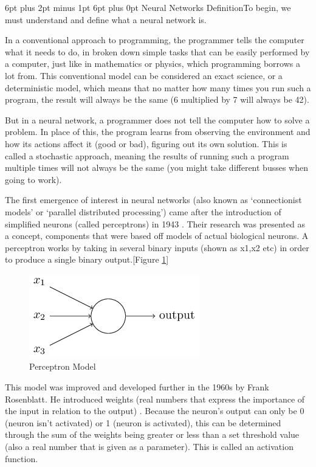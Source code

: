 \documentclass[12pt,a4paper]{article}
\makeatletter
\renewcommand\subsection{\@startsection {subsection}{1}{2mm} %
                               {6pt plus 2pt minus 1pt} %
                               {6pt plus 0pt} %
                               {\normalfont\bfseries}}
\makeatother
\begin{document}
\subsection{Neural Networks Definition}To begin, we must understand and define what a neural network is.\par
In a conventional approach to programming, the programmer tells the computer what it needs to do, in broken down simple tasks that can be easily performed by a computer, just like in mathematics or physics, which programming borrows a lot from. This conventional model can be considered an exact science, or a deterministic model, which means that no matter how many times you run such a program, the result will always be the same (6 multiplied by 7 will always be 42).\par
But in a neural network, a programmer does not tell the computer how to solve a problem. In place of this, the program learns from observing the environment and how its actions affect it (good or bad), figuring out its own solution. This is called a stochastic approach, meaning the results of running such a program multiple times will not always be the same (you might take different busses when going to work).\par
The first emergence of interest in neural networks (also known as ‘connectionist models’ or ‘parallel distributed processing’) \cite{krose_introduction_1993} came after the introduction of simplified neurons (called perceptrons) in 1943 \cite{mcculloch_logical_1943}. Their research was presented as a concept, components that were based off models of actual biological neurons. A perceptron works by taking in several binary inputs (shown as x1,x2 etc)  in order to produce a single binary output.[Figure \ref{fig:1}]\newpage
\begin{figure}[ht]
	\includegraphics{perceptron}
	\centering
	\caption{Perceptron Model \protect \cite{nielsenneural}}
	\label{fig:1}
\end{figure}
\par
This model was improved and developed further in the 1960s by Frank Rosenblatt. He introduced weights (real numbers that express the importance of the input in relation to the output) \cite{rosenblatt_perceptron:_1958}. Because the neuron’s output can only be 0 (neuron isn’t activated) or 1 (neuron is activated), this can be determined through the sum of the weights being greater or less than a set threshold value (also a real number that is given as a parameter). This is called an activation function.
\end{document}
